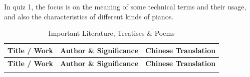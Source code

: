 \documentclass[math,code]{amznotes}
\theoremstyle{remark}
\begin{document}
In quiz 1, the focus is on the meaning of some technical terms and their usage, and also the characteristics of different kinds of pianos.


\begin{longtable}{p{} p{} p{}}
\caption{Important Literature, Treatises \& Poems} \\
\toprule
\textbf{Title / Work} & \textbf{Author \& Significance} & \textbf{Chinese Translation} \\
\midrule
\endfirsthead

\toprule
\textbf{Title / Work} & \textbf{Author \& Significance} & \textbf{Chinese Translation} \\
\midrule
\endhead

\bottomrule
\endfoot


\end{longtable}
\end{document}
